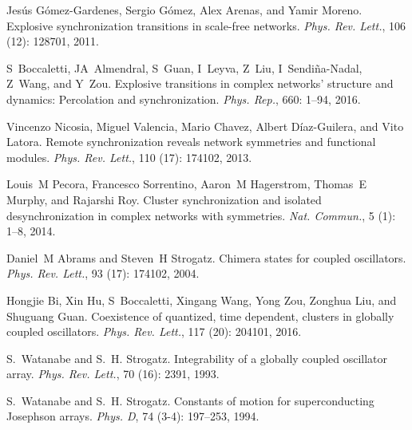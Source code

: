 Jes{\'u}s {G{\'o}mez-Gardenes}, Sergio G{\'o}mez, Alex Arenas, and Yamir
Moreno.
\newblock Explosive synchronization transitions in scale-free networks.
\newblock \emph{Phys. Rev. Lett.}, 106 (12): 128701, 2011.

S~Boccaletti, JA~Almendral, S~Guan, I~Leyva, Z~Liu, I~{Sendi{\~n}a-Nadal},
Z~Wang, and Y~Zou.
\newblock Explosive transitions in complex networks' structure and dynamics:
{{Percolation}} and synchronization.
\newblock \emph{Phys. Rep.}, 660: 1--94, 2016.

Vincenzo Nicosia, Miguel Valencia, Mario Chavez, Albert {D{\'i}az-Guilera}, and
Vito Latora.
\newblock Remote synchronization reveals network symmetries and functional
modules.
\newblock \emph{Phys. Rev. Lett.}, 110 (17): 174102, 2013.

Louis~M Pecora, Francesco Sorrentino, Aaron~M Hagerstrom, Thomas~E Murphy, and
Rajarshi Roy.
\newblock Cluster synchronization and isolated desynchronization in complex
networks with symmetries.
\newblock \emph{Nat. Commun.}, 5 (1): 1--8, 2014.

Daniel~M Abrams and Steven~H Strogatz.
\newblock Chimera states for coupled oscillators.
\newblock \emph{Phys. Rev. Lett.}, 93 (17): 174102, 2004.

Hongjie Bi, Xin Hu, S~Boccaletti, Xingang Wang, Yong Zou, Zonghua Liu, and
Shuguang Guan.
\newblock Coexistence of quantized, time dependent, clusters in globally
coupled oscillators.
\newblock \emph{Phys. Rev. Lett.}, 117 (20): 204101, 2016.

S.~Watanabe and S.~H. Strogatz.
\newblock Integrability of a globally coupled oscillator array.
\newblock \emph{Phys. Rev. Lett.}, 70 (16): 2391, 1993.

S.~Watanabe and S.~H. Strogatz.
\newblock Constants of motion for superconducting {{Josephson}} arrays.
\newblock \emph{Phys. D}, 74 (3-4): 197--253, 1994.

